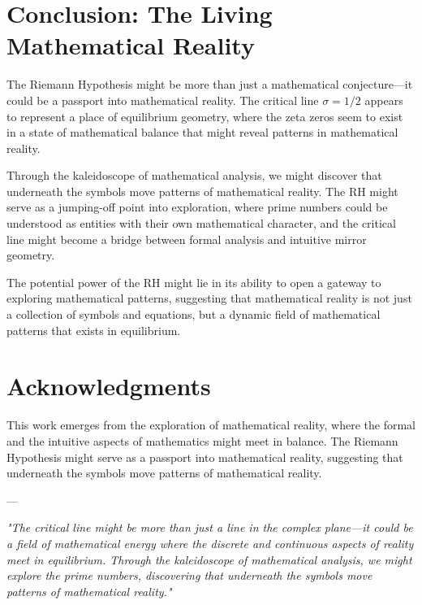 \documentclass{article}
\begin{document}
\section{Conclusion: The Living Mathematical Reality}

The Riemann Hypothesis might be more than just a mathematical conjecture—it could be a passport into mathematical reality. The critical line $\sigma = 1/2$ appears to represent a place of equilibrium geometry, where the zeta zeros seem to exist in a state of mathematical balance that might reveal patterns in mathematical reality.

Through the kaleidoscope of mathematical analysis, we might discover that underneath the symbols move patterns of mathematical reality. The RH might serve as a jumping-off point into exploration, where prime numbers could be understood as entities with their own mathematical character, and the critical line might become a bridge between formal analysis and intuitive mirror geometry.

The potential power of the RH might lie in its ability to open a gateway to exploring mathematical patterns, suggesting that mathematical reality is not just a collection of symbols and equations, but a dynamic field of mathematical patterns that exists in equilibrium.

\section*{Acknowledgments}

This work emerges from the exploration of mathematical reality, where the formal and the intuitive aspects of mathematics might meet in balance. The Riemann Hypothesis might serve as a passport into mathematical reality, suggesting that underneath the symbols move patterns of mathematical reality.

---

\textit{"The critical line might be more than just a line in the complex plane—it could be a field of mathematical energy where the discrete and continuous aspects of reality meet in equilibrium. Through the kaleidoscope of mathematical analysis, we might explore the prime numbers, discovering that underneath the symbols move patterns of mathematical reality."}
\end{document}
